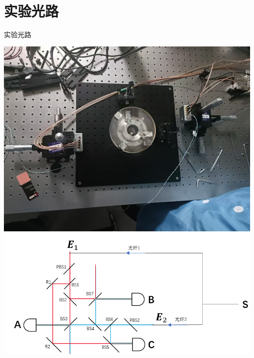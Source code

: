 \documentclass{beamer}
\begin{document}
\section{实验光路}
\begin{frame}{实验光路}
    \begin{minipage}[t]{\textwidth}
        \includegraphics[width=\linewidth, height=0.45\textheight, keepaspectratio]{image/1.jpg}
        \vspace{0.5em} %
        \includegraphics[width=\linewidth, height=0.45\textheight, keepaspectratio]{image/2.png}
    \end{minipage}
\end{frame}
\end{document}
